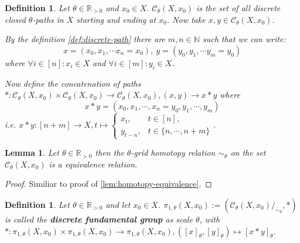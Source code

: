 \documentclass[a4paper, 11pt, twoside]{article}
\newcommand{\R}[0]{\mathbb{R}}
\newcommand{\N}[0]{\mathbb{N}}
\theoremstyle{break}
\theoremstyle{break}
\newtheorem{defin}[thm]{Definition}
\newtheorem{lemma}[thm]{Lemma}
\begin{document}
\begin{defin}
  Let $\theta \in \R_{>0}$ and $x_0 \in X$. $\mathcal{C}_{\theta}(X, x_0)$ is the set of all discrete closed $\theta$-paths in $X$ starting and ending at $x_0$. Now take $x, y \in \mathcal{C}_{\theta}(X, x_0)$.
  
  By the definition \ref{def:discrete-path} there are $m,n \in \N$ such that we can write: 
  \begin{equation*}
    x = (x_0, x_1, \cdots x_n = x_0), \: y = (y_0, y_1, \cdots y_m = y_0)
  \end{equation*} where $\forall i \in [n]: x_i \in X$ and $\forall i \in [m]: y_i \in X$.

  Now define the concatenation of paths $*: \mathcal{C}_{\theta}(X, x_0) \times \mathcal{C}_{\theta}(X, x_0) \to \mathcal{C}_{\theta}(X, x_0), (x, y) \to x * y$ where
  \begin{equation*}
    x * y = (x_0, x_1, \cdots, x_n = y_0, y_1, \cdots, y_m)
  \end{equation*}
  i.e. $x * y: [n+m] \to X, t \mapsto \begin{cases}
    x_t, &t \in [n], \\
    y_{t-n}, &t \in \{n, \cdots, n+m\}
  \end{cases}$.
\end{defin}

\begin{lemma} \label{lem:discrete-homotopy}
  Let $\theta \in \R_{>0}$ then the $\theta$-grid homotopy relation $\sim_{\theta}$ on the set $\mathcal{C}_{\theta}(X, x_0)$ is a equivalence relation.
\end{lemma}

\begin{proof}
  Similiar to proof of \ref{lem:homotopy-equivalence}.
\end{proof}

\begin{defin}
  Let $\theta \in \R_{>0}$ and let $x_0 \in X$. $\pi_{1,\theta}(X, x_0) := (\mathcal{C}_{\theta}(X, x_0)/_{\sim_{\theta}}, *)$ is called the \textbf{discrete fundamental group} as scale $\theta$,
  with $*: \pi_{1,\theta}(X, x_0) \times \pi_{1,\theta}(X, x_0) \to \pi_{1,\theta}(X, x_0), ([x]_{\theta}, [y]_{\theta}) \mapsto [x * y]_{\theta}$.
\end{defin}
\end{document}
